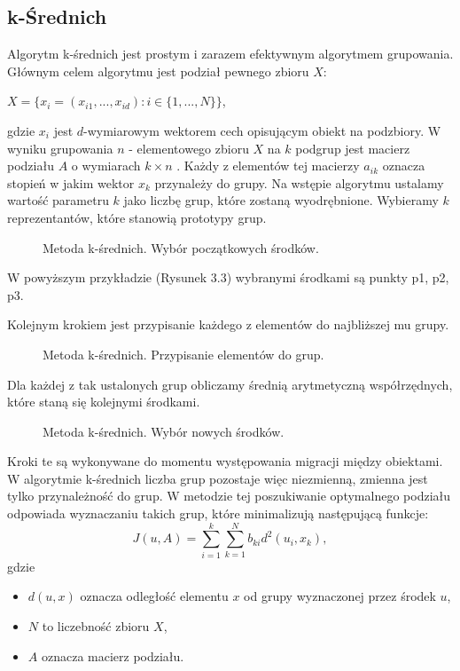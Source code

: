 \documentclass[12pt,a4paper]{report}
\begin{document}
\subsection{k-Średnich}%
Algorytm k-średnich jest prostym i zarazem efektywnym algorytmem grupowania.
Głównym celem algorytmu jest podział pewnego zbioru $X$:
\begin{center}
$X = \{x_i = (x_{i1},...,x_{id}) : i \in \{1,...,N\}\}$,
\end{center}
gdzie $x_i$ jest $d$-wymiarowym wektorem cech opisującym obiekt na podzbiory.
W wyniku grupowania $n$ - elementowego zbioru $X$ na $k$ podgrup jest macierz podziału $A$ o wymiarach $k\times n$ . Każdy z elementów tej macierzy $a_{ik}$ oznacza stopień w jakim wektor $x_k$ przynależy do grupy.
Na wstępie algorytmu ustalamy wartość parametru $k$ jako liczbę grup, które zostaną wyodrębnione. Wybieramy $k$ reprezentantów, które stanowią prototypy grup.
\begin{center}
\begin{figure}[H]
\centering
\caption{Metoda k-średnich. Wybór początkowych środków.}
\end{figure}
\end{center}
W powyższym przykładzie (Rysunek 3.3) wybranymi środkami są punkty p1, p2, p3.

Kolejnym krokiem jest przypisanie każdego z elementów do najbliższej mu grupy.
\begin{center}
\begin{figure}[H]
\centering
\caption{Metoda k-średnich. Przypisanie elementów do grup.}
\end{figure}
\end{center}
Dla każdej z tak ustalonych grup obliczamy średnią arytmetyczną współrzędnych, które staną się kolejnymi środkami.
\begin{center}
\begin{figure}[H]
\centering
\caption{Metoda k-średnich. Wybór nowych środków.}
\end{figure}
\end{center}
Kroki te są wykonywane do momentu występowania migracji między obiektami.
W algorytmie k-średnich liczba grup pozostaje więc niezmienną, zmienna jest tylko przynależność do grup.
W metodzie tej poszukiwanie optymalnego podziału odpowiada wyznaczaniu takich grup, które minimalizują następującą funkcje:
$$J(u,A) = \sum_{i=1}^k \sum_{k=1}^N b_{ki}d^2(u_i,x_k),$$
gdzie 
\begin{itemize}
\item $d(u,x)$ oznacza odległość elementu $x$ od grupy wyznaczonej przez środek $u$,
\item $N$ to liczebność zbioru $X$,
\item $A$ oznacza macierz podziału.
\end{itemize}
 
\end{document}
